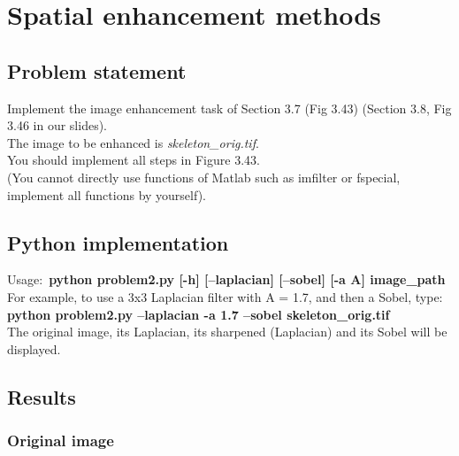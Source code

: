 \chapter{Spatial enhancement methods}

\section{Problem statement}

Implement the image enhancement task of Section 3.7 (Fig 3.43) (Section 3.8, Fig 3.46 in our slides).\\
The image to be enhanced is \textit{skeleton\_orig.tif}.\\
You should implement all steps in Figure 3.43. \\
(You cannot directly use functions of Matlab such as
imfilter or fspecial, implement all functions by yourself).

\section{Python implementation}

Usage:~\textbf{python problem2.py [-h] [--laplacian] [--sobel] [-a A] image\_path} \\

For example, to use a 3x3 Laplacian filter with A = 1.7, and then a Sobel, type:~\\

\textbf{python problem2.py --laplacian -a 1.7 --sobel skeleton\_orig.tif} \\

The original image, its Laplacian, its sharpened (Laplacian) and its Sobel will be displayed.

\pagebreak
\section{Results}

    \subsection{Original image}

